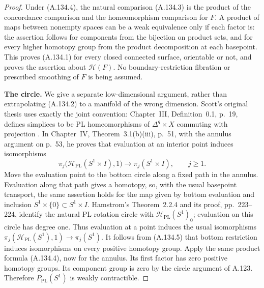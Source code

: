 \begin{proof}
Under (A.134.4), the natural comparison (A.134.3) is the product of the
concordance comparison and the homeomorphism comparison for $F$.
A product of maps between nonempty spaces can be a weak equivalence
only if each factor is: the assertion follows for components from the
bijection on product sets, and for every higher homotopy group from
the product decomposition at each basepoint. This proves (A.134.1)
for every closed connected surface, orientable or not, and proves the
assertion about $\mathcal H(F)$. No boundary-restriction fibration or
prescribed smoothing of $F$ is being assumed.

\textbf{The circle.}
We give a separate low-dimensional argument, rather than extrapolating
(A.134.2) to a manifold of the wrong dimension. Scott's original thesis
uses exactly the joint convention: Chapter~III, Definition~0.1, p.~19,
defines simplices to be PL homeomorphisms of $\Delta^q\times X$
commuting with projection \cite{Scott1968}. In Chapter~IV,
Theorem~3.1(b)(iii), p.~51, with the annulus argument on p.~53, he proves
that evaluation at an interior point induces isomorphisms
\[
 \pi_j\bigl(\mathcal H_{\mathrm{PL}}(S^1\times I),1\bigr)
 \longrightarrow\pi_j(S^1\times I),\qquad j\geq1.
                                                        \tag{A.134.5}
\]
Move the evaluation point to the bottom circle along a fixed path in
the annulus. Evaluation along that path gives a homotopy, so, with the usual basepoint transport, the same
assertion holds for the map given by bottom evaluation and inclusion
$S^1\times\{0\}\subset S^1\times I$.
Hamstrom's Theorem~2.2.4 and its proof, pp.~223--224, identify the
natural PL rotation circle with $\mathcal H_{\mathrm{PL}}(S^1)_0$;
evaluation on this circle has degree one. Thus evaluation at a point
induces the usual isomorphisms
$\pi_j(\mathcal H_{\mathrm{PL}}(S^1),1)\to\pi_j(S^1)$.
It follows from (A.134.5) that bottom restriction induces isomorphisms
on every positive homotopy group. Apply the same product formula
(A.134.4), now for the annulus. Its first factor has zero positive
homotopy groups. Its component group is zero by the circle argument
of A.123. Therefore $P_{\mathrm{PL}}(S^1)$ is weakly contractible.


\end{proof}
